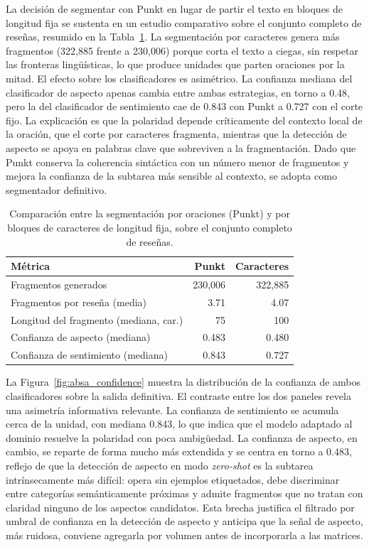 La decisión de segmentar con Punkt en lugar de partir el texto en bloques de longitud fija se
sustenta en un estudio comparativo sobre el conjunto completo de reseñas, resumido en la
Tabla~\ref{tab:punkt_vs_char}. La segmentación por caracteres genera más fragmentos (322,885
frente a 230,006) porque corta el texto a ciegas, sin respetar las fronteras lingüísticas, lo
que produce unidades que parten oraciones por la mitad. El efecto sobre los clasificadores es
asimétrico. La confianza mediana del clasificador de aspecto apenas cambia entre ambas
estrategias, en torno a 0.48, pero la del clasificador de sentimiento cae de 0.843 con Punkt a
0.727 con el corte fijo. La explicación es que la polaridad depende críticamente del contexto
local de la oración, que el corte por caracteres fragmenta, mientras que la detección de aspecto
se apoya en palabras clave que sobreviven a la fragmentación. Dado que Punkt conserva la
coherencia sintáctica con un número menor de fragmentos y mejora la confianza de la subtarea más
sensible al contexto, se adopta como segmentador definitivo.

\begin{table}[ht]
	\centering
	\caption{Comparación entre la segmentación por oraciones (Punkt) y por bloques de
		caracteres de longitud fija, sobre el conjunto completo de reseñas.}
	\label{tab:punkt_vs_char}
	\begin{tabular}{lrr}
		\toprule
		\textbf{Métrica}                       & \textbf{Punkt} & \textbf{Caracteres} \\
		\midrule
		Fragmentos generados                   & 230,006        & 322,885             \\
		Fragmentos por reseña (media)          & 3.71           & 4.07                \\
		Longitud del fragmento (mediana, car.) & 75             & 100                 \\
		Confianza de aspecto (mediana)         & 0.483          & 0.480               \\
		Confianza de sentimiento (mediana)     & 0.843          & 0.727               \\
		\bottomrule
	\end{tabular}
\end{table}

La Figura~\ref{fig:absa_confidence} muestra la distribución de la confianza de ambos
clasificadores sobre la salida definitiva. El contraste entre los dos paneles revela una
asimetría informativa relevante. La confianza de sentimiento se acumula cerca de la unidad, con
mediana 0.843, lo que indica que el modelo adaptado al dominio resuelve la polaridad con poca
ambigüedad. La confianza de aspecto, en cambio, se reparte de forma mucho más extendida y se
centra en torno a 0.483, reflejo de que la detección de aspecto en modo \textit{zero-shot} es la
subtarea intrínsecamente más difícil: opera sin ejemplos etiquetados, debe discriminar entre
categorías semánticamente próximas y admite fragmentos que no tratan con claridad ninguno de los
aspectos candidatos. Esta brecha justifica el filtrado por umbral de confianza en la detección de
aspecto y anticipa que la señal de aspecto, más ruidosa, conviene agregarla por volumen antes de
incorporarla a las matrices.


